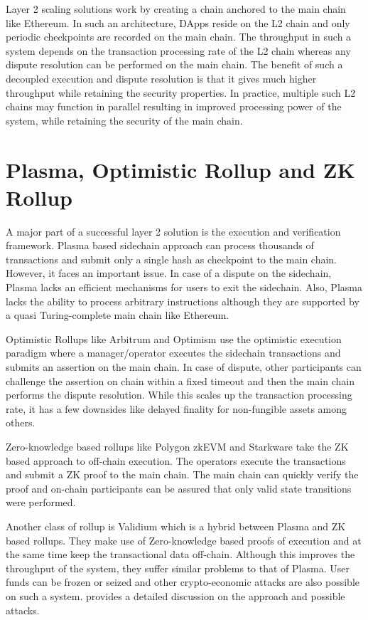 \documentclass[sigconf, screen=true, nonacm]{acmart}
\begin{document}
    Layer 2 scaling solutions work by creating a chain anchored to the main chain like Ethereum. In such an architecture, DApps reside on the L2 chain and only periodic checkpoints are recorded on the main chain. The throughput in such a system depends on the transaction processing rate of the L2 chain whereas any dispute resolution can be performed on the main chain. The benefit of such a decoupled execution and dispute resolution is that it gives much higher throughput while retaining the security properties. In practice, multiple such L2 chains may function in parallel resulting in improved processing power of the system, while retaining the security of the main chain. 

\section{Plasma, Optimistic Rollup and ZK Rollup}\label{rollup}
    A major part of a successful layer 2 solution is the execution and verification framework. Plasma based sidechain approach can process thousands of transactions and submit only a single hash as checkpoint to the main chain. However, it faces an important issue. In case of a dispute on the sidechain, Plasma lacks an efficient mechanisms for users to exit the sidechain. Also, Plasma lacks the ability to process arbitrary instructions although they are supported by a quasi Turing-complete main chain like Ethereum. 

    Optimistic Rollups like Arbitrum and Optimism use the optimistic execution paradigm where a manager/operator executes the sidechain transactions and submits an assertion on the main chain. In case of dispute, other participants can challenge the assertion on chain within a fixed timeout and then the main chain performs the dispute resolution. While this scales up the transaction processing rate, it has a few downsides like delayed finality for non-fungible assets among others. 

    Zero-knowledge based rollups like Polygon zkEVM and Starkware take the ZK based approach to off-chain execution. The operators execute the transactions and submit a ZK proof to the main chain. The main chain can quickly verify the proof and on-chain participants can be assured that only valid state transitions were performed. 

    Another class of rollup is Validium which is a hybrid between Plasma and ZK based rollups. They make use of Zero-knowledge based proofs of execution and at the same time keep the transactional data off-chain. Although this improves the throughput of the system, they suffer similar problems to that of Plasma. User funds can be frozen or seized and other crypto-economic attacks are also possible on such a system. \cite{StarkEx:2020} provides a detailed discussion on the approach and possible attacks. 
\end{document}
